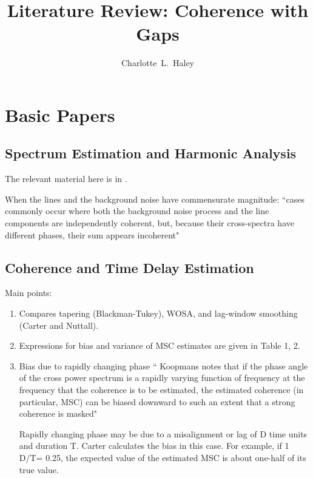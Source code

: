\documentclass{article}
\begin{document}
\title{Literature Review: Coherence with Gaps}

\author{Charlotte~L.~Haley}

\maketitle
\tableofcontents

\section{Basic Papers}

  \subsection{Spectrum Estimation and Harmonic Analysis}

  The relevant material here is in \cite[\S XIV]{t82}. 

  When the lines and the background noise have commensurate magnitude: ``cases commonly occur where
  both the background noise process and the line components are independently coherent, but, because
  their cross-spectra have different phases, their sum appears incoherent"

  \subsection{Coherence and Time Delay Estimation}

  Main points:
  \begin{enumerate}
  \item Compares tapering (Blackman-Tukey), WOSA, and lag-window smoothing (Carter and Nuttall). 
  \item Expressions for bias and variance of MSC estimates are given in Table 1, 2. 
  \item Bias due to rapidly changing phase 
      `` Koopmans \cite{koopmans} notes that if the phase angle of the cross power spectrum is a
  rapidly varying function of frequency at the frequency that the coherence is to be estimated, the
  estimated coherence (in particular, MSC) can be biased downward to such an extent that a strong
  coherence is masked"
    
    Rapidly changing phase may be due to a misalignment or lag of D time units and duration T.
  Carter calculates the bias in this case. For example, if 1 D/T= 0.25, the expected value of the
  estimated MSC is about one-half of its true value.

  \end{enumerate}
\end{document}
